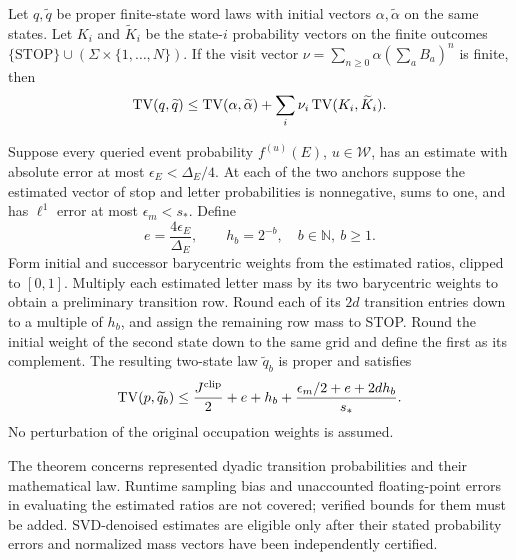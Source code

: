 \begin{lemma}
\label{II:U:lem:stopped-coupling}
Let $q,\widetilde q$ be proper finite-state word laws with initial
vectors $\alpha,\widetilde\alpha$ on the same states. Let $K_i$ and
$\widetilde K_i$ be the state-$i$ probability vectors on the finite
outcomes $\{\mathrm{STOP}\}\cup(\Sigma\times\{1,\ldots,N\})$.
If the visit vector $\nu=\sum_{n\ge0}\alpha(\sum_a B_a)^n$ is finite, then
\[
 \operatorname{TV}(q,\widetilde q)
 \le\operatorname{TV}(\alpha,\widetilde\alpha)
       +\sum_i\nu_i\operatorname{TV}(K_i,\widetilde K_i).
\]
\end{lemma}


\begin{theorem}
\label{II:U:thm:rank-two-rounding}
Suppose every queried event probability $f^{(u)}(E)$, $u\in\mathcal W$,
has an estimate with absolute error at most $\epsilon_E<\Delta_E/4$.
At each of the two anchors suppose the estimated vector of stop and
letter probabilities is nonnegative, sums to one, and has $\ell^1$
error at most $\epsilon_m<s_*$. Define
\[
 e=\frac{4\epsilon_E}{\Delta_E},\qquad
 h_b=2^{-b},\quad b\in\mathbb N,\ b\ge1.
\]
Form initial and successor barycentric weights from the estimated
ratios, clipped to $[0,1]$. Multiply each estimated letter mass by
its two barycentric weights to obtain a preliminary transition row.
Round each of its $2d$ transition entries down to a multiple of $h_b$,
and assign the remaining row mass to STOP. Round the initial weight
of the second state down to the same grid and define the first as
its complement. The resulting two-state law $\widetilde q_b$ is proper
and satisfies
\begin{equation}
 \operatorname{TV}(p,\widetilde q_b)\le
 \frac{J^{\rm clip}}2+e+h_b+
 \frac{\epsilon_m/2+e+2dh_b}{s_*}.
 \label{II:U:eq:rank-two-rounding}
\end{equation}
No perturbation of the original occupation weights is assumed.
\end{theorem}

The theorem concerns represented dyadic transition probabilities and
their mathematical law. Runtime sampling bias and unaccounted
floating-point errors in evaluating the estimated ratios are not
covered; verified bounds for them must be added. SVD-denoised estimates
are eligible only after their stated probability errors and normalized
mass vectors have been independently certified.

